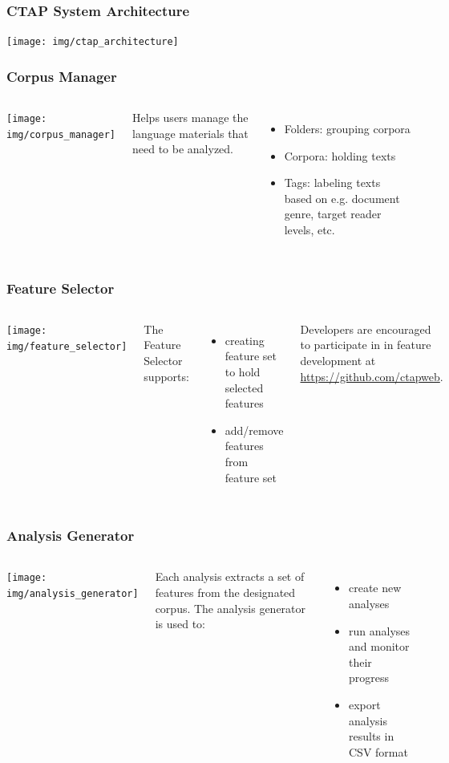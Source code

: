 \documentclass{beamer}
\begin{document}
	\begin{frame}
		\frametitle{CTAP System Architecture}

		\centering
		\texttt{[image: img/ctap\_architecture]}
	\end{frame}

	\begin{frame}
		\frametitle{Corpus Manager}

		\begin{columns}
			\column{0.4\textwidth}
				 \centering
				  \texttt{[image: img/corpus\_manager]}

			\column{0.6\textwidth}
				  Helps users manage the language materials that need to be
				  analyzed. 
				  \begin{itemize}
					  \item Folders: grouping corpora
					  \item Corpora: holding texts
					  \item Tags: labeling texts based on e.g. document genre,
					  target reader levels, etc.
				  \end{itemize}
		\end{columns}
	\end{frame}

	\begin{frame}
		\frametitle{Feature Selector}

		\begin{columns}
				  \texttt{[image: img/feature\_selector]}

				The Feature Selector supports: 
				  \begin{itemize}
					  \item creating feature set to hold selected features
					  \item add/remove features from feature set
				  \end{itemize}

				  Developers are encouraged to participate in in feature
				  development at \url{https://github.com/ctapweb}.
		\end{columns}
	\end{frame}

	\begin{frame}
		\frametitle{Analysis Generator}

		\begin{columns}
			\column{0.4\textwidth}
				  \texttt{[image: img/analysis\_generator]}

			\column{0.6\textwidth}
				 Each analysis extracts a set of features from the designated
				 corpus. 
				 The analysis generator is used to:
				  \begin{itemize}
					  \item create new analyses
					  \item run analyses and monitor their progress
					  \item export analysis results in CSV format
				  \end{itemize}
		\end{columns}
	\end{frame}
\end{document}
